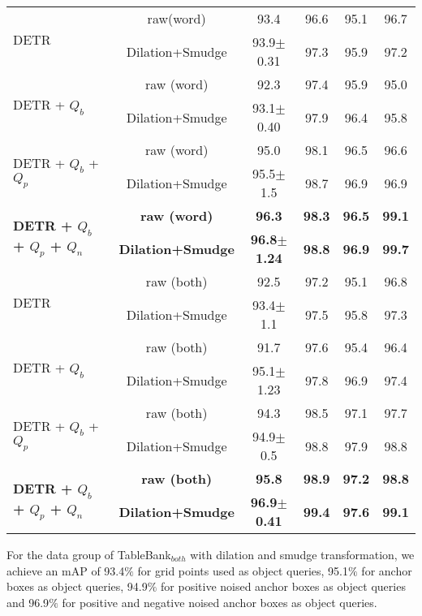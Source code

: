 \documentclass[sn-mathphys]{sn-jnl}\jyear{2021}\theoremstyle{thmstyleone}\newtheorem{theorem}{Theorem}\newtheorem{proposition}[theorem]{Proposition}\theoremstyle{thmstyletwo}\newtheorem{example}{Example}\newtheorem{remark}{Remark}\theoremstyle{thmstylethree}\newtheorem{definition}{Definition}\usepackage{amsmath}
\begin{document}
\begin{table*}
\begin{center}
\begin{tabular*}{\textwidth}{@{\extracolsep{\fill}}lccccc@{\extracolsep{\fill}}}
\multirow{2}{*}{DETR} & raw(word)  & 93.4& 96.6 & 95.1 & 96.7\\
& Dilation+Smudge  & 93.9$\pm$0.31 & 97.3 & 95.9  & 97.2\\
\midrule

\multirow{2}{*}{DETR + $Q_b$} & raw (word) & 92.3 & 97.4 & 95.9  & 95.0\\
& Dilation+Smudge & 93.1$\pm$0.40 & 97.9 & 96.4  & 95.8\\
\midrule

\multirow{2}{*}{DETR + $Q_b$ + $Q_p$} & raw (word) & 95.0 & 98.1 & 96.5 & 96.6 \\
& Dilation+Smudge & 95.5$\pm$1.5 & 98.7 & 96.9 & 96.9\\
\midrule

\multirow{2}{*}{\textbf{DETR + $Q_b$ + $Q_p$ + $Q_n$}} & \textbf{raw (word)} & \textbf{96.3} & \textbf{98.3} & \textbf{96.5} & \textbf{99.1}\\
& \textbf{Dilation+Smudge} & \textbf{96.8$\pm$1.24} & \textbf{98.8}& \textbf{96.9}& \textbf{99.7}\\
\midrule

\multirow{2}{*}{DETR}& raw (both)& 92.5 & 97.2 & 95.1 &  96.8\\
& Dilation+Smudge & 93.4$\pm$1.1 & 97.5 & 95.8 & 97.3\\
\midrule

\multirow{2}{*}{DETR + $Q_b$} & raw (both)& 91.7 & 97.6 & 95.4 & 96.4\\
& Dilation+Smudge & 95.1$\pm$1.23 & 97.8 & 96.9  & 97.4\\
\midrule

\multirow{2}{*}{DETR + $Q_b$ + $Q_p$} & raw (both) & 94.3 & 98.5 & 97.1 & 97.7 \\
& Dilation+Smudge & 94.9$\pm$0.5 & 98.8 & 97.9 & 98.8\\
\midrule

\multirow{2}{*}{\textbf{DETR + $Q_b$ + $Q_p$ + $Q_n$}} & \textbf{raw (both)} & \textbf{95.8} & \textbf{98.9} & \textbf{97.2} & \textbf{98.8}\\
& \textbf{Dilation+Smudge} & \textbf{96.9$\pm$0.41} & \textbf{99.4} & \textbf{97.6} & \textbf{99.1}\\

\bottomrule
\end{tabular*}
\end{center}
\end{table*} 
For the data group of TableBank$_{both}$ with dilation and smudge transformation, we achieve an mAP of 93.4$\%$ for grid points used as object queries, 95.1$\%$ for anchor boxes as object queries, 94.9$\%$ for positive noised anchor boxes as object queries and 96.9$\%$ for positive and negative noised anchor boxes as object queries. \\
\end{document}
